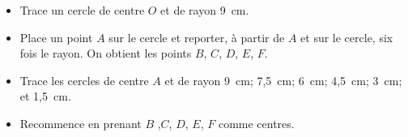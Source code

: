 \begin{itemize}
\item Trace un cercle de centre $O$ et de rayon 9~cm.
\item Place un point $A$ sur le cercle et reporter, à partir de $A$
et sur le cercle, six fois le rayon. On obtient les points
$B$, $C$, $D$, $E$, $F$.
\item Trace les cercles de centre $A$ et de rayon
9~cm; 7,5~cm; 6~cm; 4,5~cm; 3~cm; et 1,5~cm.
\item Recommence en prenant $B$ ,$C$, $D$, $E$, $F$ comme centres.
\end{itemize}